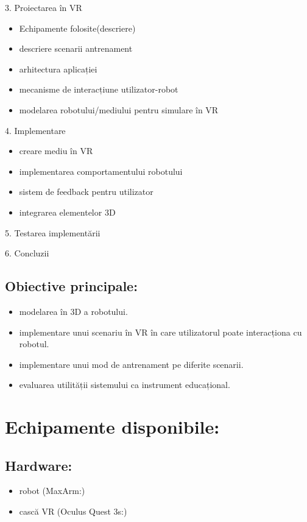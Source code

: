\documentclass[a4paper,12pt]{report}
\begin{document}
3. Proiectarea în VR
  \begin{itemize}
     \item Echipamente folosite(descriere)
       \item  descriere scenarii antrenament
       \item  arhitectura aplicației
       \item mecanisme de interacțiune utilizator-robot
        \item modelarea robotului/mediului pentru simulare în VR
 \end{itemize}

4. Implementare
  \begin{itemize}
 
       \item  creare mediu în VR
       \item  implementarea comportamentului robotului
       \item sistem de feedback pentru utilizator
        \item integrarea elementelor 3D
 \end{itemize}
 
 5. Testarea implementării

 6. Concluzii

\subsection{Obiective principale:}
  \begin{itemize}
       \item  modelarea în 3D a robotului.
       \item  implementare unui scenariu în VR în care utilizatorul poate interacționa cu robotul.
       \item implementare unui mod de antrenament pe diferite scenarii.
        \item evaluarea utilității sistemului ca instrument educațional.
 \end{itemize}


\section{Echipamente disponibile:}
  \subsection{Hardware:}
  \begin{itemize}
       \item  robot (MaxArm:)
       \item  cască VR (Oculus Quest 3s:)
    
 \end{itemize}
\end{document}
